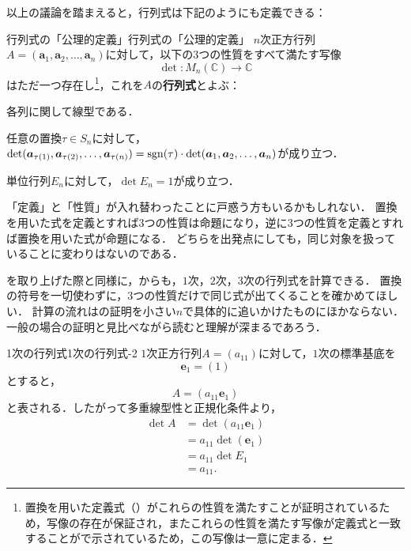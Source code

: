 以上の議論を踏まえると，行列式は下記のようにも定義できる：

\begin{definition}{行列式の「公理的定義」}{行列式の「公理的定義」}
  $n$次正方行列$A = (\bm{a}_1, \bm{a}_2, \dots, \bm{a}_n)$に対して，以下の3つの性質をすべて満たす写像
  \[
  \det \colon M_n(\mathbb{C}) \to \mathbb{C}
  \]
  はただ一つ存在し\footnote{置換を用いた定義式（）がこれらの性質を満たすことが証明されているため，写像の存在が保証され，またこれらの性質を満たす写像が定義式と一致することがで示されているため，この写像は一意に定まる．}，これを$A$の\textbf{行列式}とよぶ：
  \begin{description}[labelwidth=5\zw,leftmargin=!, itemsep=0pt]
   \item [多重線型性]各列に関して線型である．
   \item [交代性]任意の置換$\tau \in S_n$に対して，$\det(\bm{a}_{\tau(1)}, \bm{a}_{\tau(2)}, \dots, \bm{a}_{\tau(n)}) = \operatorname{sgn}(\tau) \cdot \det(\bm{a}_1, \bm{a}_2, \dots, \bm{a}_n)$が成り立つ．
   \item [正規化条件]単位行列$E_n$に対して，$\det E_n = 1$が成り立つ．
  \end{description}
\end{definition}

「定義」と「性質」が入れ替わったことに戸惑う方もいるかもしれない．
置換を用いた式を定義とすれば$3$つの性質は命題になり，逆に$3$つの性質を定義とすれば置換を用いた式が命題になる．
どちらを出発点にしても，同じ対象を扱っていることに変わりはないのである．

を取り上げた際と同様に，からも，$1$次，$2$次，$3$次の行列式を計算できる．
置換の符号を一切使わずに，$3$つの性質だけで同じ式が出てくることを確かめてほしい．
計算の流れはの証明を小さい$n$で具体的に追いかけたものにほかならない．
一般の場合の証明と見比べながら読むと理解が深まるであろう．

\begin{example}{1次の行列式}{1次の行列式-2}
  $1$次正方行列$A=(a_{11})$に対して，$1$次の標準基底を
  \[
    \bm{e}_1=(1)
  \]
  とすると，
  \[
    A=(a_{11}\bm{e}_1)
  \]
  と表される．したがって多重線型性と正規化条件より，
  \begin{align*}
    \det A
    &=\det(a_{11}\bm{e}_1)\\
    &=a_{11}\det(\bm{e}_1)\\
    &=a_{11}\det E_1\\
    &=a_{11}.
  \end{align*}
\end{example}

